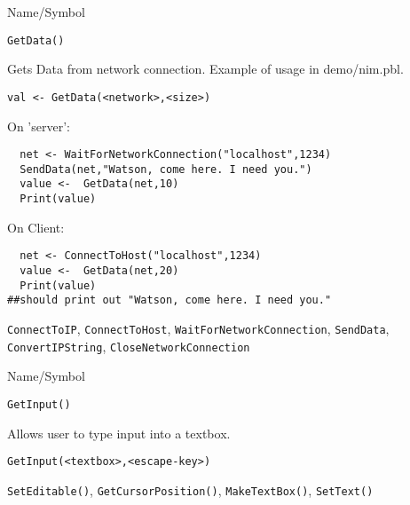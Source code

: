\begin{desc}{Name/Symbol}
\item[Name/Symbol]	\verb+GetData()+

\item[Description]	Gets Data from network connection.  Example of
  usage in demo/nim.pbl.

\item[Usage]
\begin{verbatim}
val <- GetData(<network>,<size>)
\end{verbatim}

\item[Example]	

On 'server':
\begin{verbatim}
  net <- WaitForNetworkConnection("localhost",1234)
  SendData(net,"Watson, come here. I need you.")
  value <-  GetData(net,10)
  Print(value)

\end{verbatim}
On Client:
\begin{verbatim}
  net <- ConnectToHost("localhost",1234)
  value <-  GetData(net,20)
  Print(value)
##should print out "Watson, come here. I need you."
\end{verbatim}
\item[See Also]
  \verb+ConnectToIP+, \verb+ConnectToHost+, \verb+WaitForNetworkConnection+,
   \verb+SendData+, \verb+ConvertIPString+, \verb+CloseNetworkConnection+
\end{desc}

\rl


\begin{desc}{Name/Symbol}
\item[Name/Symbol]	\verb+GetInput()+

\item[Description]	Allows user to type input into a textbox.

\item[Usage]
\begin{verbatim}
GetInput(<textbox>,<escape-key>)
\end{verbatim}

\item[Example]	

\item[See Also]	\verb+SetEditable()+, \verb+GetCursorPosition()+, \verb+MakeTextBox()+, \verb+SetText()+
\end{desc}

\rl

